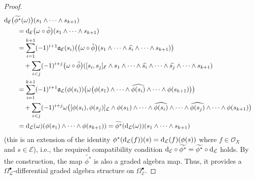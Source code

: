 \documentclass[pdftex]{sigma}
\numberwithin{equation}{section}
\theoremstyle{definition}
\begin{document}
\begin{proof}
	\begin{align*}
			& 	{\rm d}_{\mathcal{E}}\bigl(\widetilde{\phi^*}(\omega)\bigr)(s_1 \wedge \cdots \wedge s_{k+1})\\
			&\qquad = {\rm d}_{\mathcal{E}}\bigl(\omega \circ \tilde{\phi}\bigr)(s_1 \wedge \cdots \wedge s_{k+1})\\
			&\qquad = \sum^{k+1}_{i=1}(-1)^{i+1}\mathfrak{a}_{\mathcal{E}}(s_i)\bigl(\bigl(\omega \circ \tilde{\phi}\bigr) (s_1\wedge \cdots \wedge \widehat{s_i} \wedge \cdots \wedge s_{k+1})\bigr)\\
			&\qquad\quad
			+ \sum_{i< j}(-1)^{i+j} \bigl(\omega \circ \tilde{\phi}\bigr)([s_i, s_j]_{\mathcal{E}} \wedge s_1\wedge \cdots \wedge \widehat{s_i}\wedge \cdots \wedge \widehat{s_j}\wedge \cdots \wedge s_{k+1})\\
			&\qquad = \sum^{k+1}_{i=1}(-1)^{i+1}\mathfrak{a}_{\mathcal{L}}(\phi(s_i))\bigl(\omega \bigl(\phi(s_1) \wedge \cdots \wedge \widehat{\phi(s_i)} \wedge \cdots \wedge \phi(s_{k+1})\bigr)\bigr)\\
			&
			\qquad\quad + \sum_{i< j}(-1)^{i+j} \omega \bigl([\phi(s_i), \phi(s_j)]_{\mathcal{L}} \wedge \phi(s_1) \wedge \cdots \wedge \widehat{\phi(s_i)} \wedge \cdots \wedge \widehat{\phi(s_j)}\wedge \cdots \wedge \phi(s_{k+1})\bigr)\\
			&\qquad= {\rm d}_{\mathcal{L}}(\omega) (\phi(s_1) \wedge \cdots \wedge \phi(s_{k+1}))
			 = \widetilde{\phi^*}({\rm d}_{\mathcal{L}}(\omega)) (s_1 \wedge \cdots \wedge s_{k+1})
	\end{align*}
	(this is an extension of the identity $\phi^*({\rm d}_{\mathcal{L}}(f))(s)={\rm d}_{\mathcal{L}}(f)(\phi(s))$ where $f \in \mathcal{O}_X$ and $s \in \mathcal{E}$),
	i.e., the required compatibility condition ${\rm d}_{\mathcal{E}} \circ \widetilde{\phi^*}= \widetilde{\phi^*} \circ {\rm d}_{\mathcal{L}}$ holds. By the construction, the map $\widetilde{\phi^*}$ is also a graded algebra map.
	Thus, it provides a $\Omega^{\bullet}_{\mathcal{L}}$-differential graded algebra structure on $\Omega^{\bullet}_{\mathcal{E}}$.
	

\end{proof}
\end{document}
